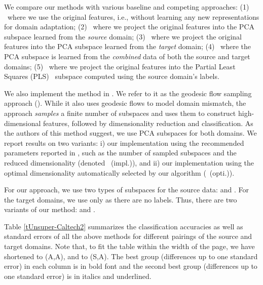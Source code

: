 We compare our methods with various baseline and competing approaches: (1)\, \OrigFeat\ where we use the original features, i.e.,  without learning any new representations for domain adaptation; (2)
\PCAs\ where we project the original features into the PCA subspace learned from the \emph{source} domain; (3) \PCAt\ where  we project the original features into the PCA subspace learned from the \emph{target} domain; (4)
\PCAst\ where the PCA subspace is learned from  the \emph{combined} data of both the source and target domains; (5) \PLSs\ where  we project the original features into the Partial Least Squares (PLS)~\cite{PLS} subspace computed using the source domain's labels. %

We also implement the method in \cite{gopalan2011domain}. We refer to it as the geodesic flow sampling approach ({\ICCV}). While it also uses geodesic flows to model domain mismatch, the approach \emph{samples} a finite number of subspaces and uses them to construct high-dimensional features, followed by dimensionality reduction and classification. As the authors of this method suggest, we use PCA subspaces for both domains. We report results on two variants: i)  our implementation using the recommended parameters reported in \cite{gopalan2011domain}, such as the number of sampled subspaces and the reduced dimensionality (denoted {\ICCV}~(impl.)), and ii) our implementation using the optimal dimensionality automatically selected by our algorithm ({\ICCV}~(opti.)).

For our approach, we use two types of subspaces for the source data: {\PCAs} and {\PLSs}.  For the target domains, we use only {\PCAt}  as there are no labels. Thus, there are two variants of our  method: {\GEO} and {\plsGEO}.


Table \ref{tUnsuper-Caltech2} summarizes the classification accuracies as well as standard errors of all the above methods for different pairings of the source and target domains. Note that, to fit the table within the width of the page, we have shortened {\GEO} to {\GFK(A,A)}, and {\plsGEO} to {\GFK(S,A)}. The best group  (differences up to one standard error) in each column is in bold font and the second best group (differences up to one standard error)  is in italics and underlined.

